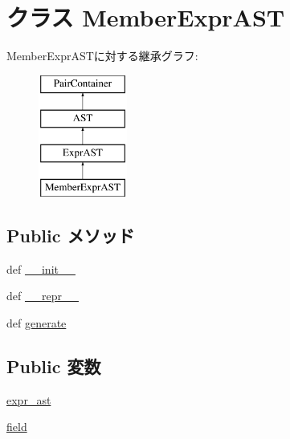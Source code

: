 \hypertarget{classslicc_1_1ast_1_1MemberExprAST_1_1MemberExprAST}{
\section{クラス MemberExprAST}
\label{classslicc_1_1ast_1_1MemberExprAST_1_1MemberExprAST}
}
MemberExprASTに対する継承グラフ:\begin{figure}[H]
\begin{center}
\leavevmode
\includegraphics[height=4cm]{classslicc_1_1ast_1_1MemberExprAST_1_1MemberExprAST}
\end{center}
\end{figure}
\subsection*{Public メソッド}
\begin{DoxyCompactItemize}
\item 
def \hyperlink{classslicc_1_1ast_1_1MemberExprAST_1_1MemberExprAST_ac775ee34451fdfa742b318538164070e}{\_\-\_\-init\_\-\_\-}
\item 
def \hyperlink{classslicc_1_1ast_1_1MemberExprAST_1_1MemberExprAST_ad8b9328939df072e4740cd9a63189744}{\_\-\_\-repr\_\-\_\-}
\item 
def \hyperlink{classslicc_1_1ast_1_1MemberExprAST_1_1MemberExprAST_a4555d1cee0dccf3942ea35fe86de2e8e}{generate}
\end{DoxyCompactItemize}
\subsection*{Public 変数}
\begin{DoxyCompactItemize}
\item 
\hyperlink{classslicc_1_1ast_1_1MemberExprAST_1_1MemberExprAST_a4faa2d9c34d29aa06b2dacd8c3aee45d}{expr\_\-ast}
\item 
\hyperlink{classslicc_1_1ast_1_1MemberExprAST_1_1MemberExprAST_ad62af17df5486963eef933792624216d}{field}
\end{DoxyCompactItemize}


